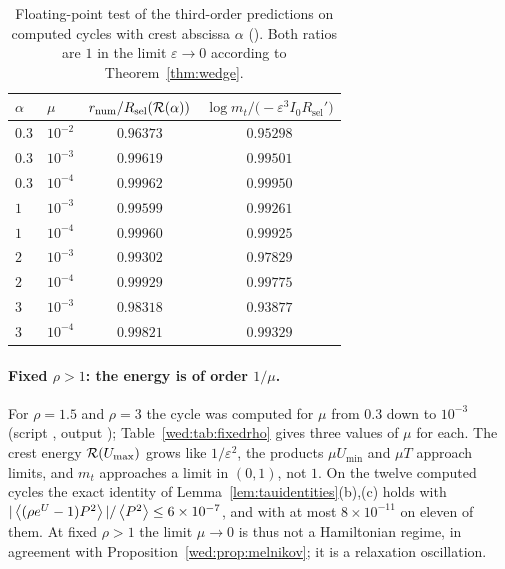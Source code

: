 \begin{table}[ht]
\centering\small
\caption{Floating-point test of the third-order predictions on computed cycles with crest abscissa $\alpha$ (\protect{}). Both ratios are $1$ in the limit $\varepsilon\to0$ according to Theorem~\ref{thm:wedge}.}\label{wed:tab:selection}
\begin{tabular}{llcc}
\toprule
$\alpha$ & $\mu$ & $r_{\rm num}/R_{\mathrm{sel}}(\mathcal R(\alpha))$ & $\log m_t\big/\bigl(-\varepsilon^3I_0R_{\mathrm{sel}}'\bigr)$\\
\midrule
$0.3$ & $10^{-2}$ & $0.96373$ & $0.95298$\\
$0.3$ & $10^{-3}$ & $0.99619$ & $0.99501$\\
$0.3$ & $10^{-4}$ & $0.99962$ & $0.99950$\\
$1$ & $10^{-3}$ & $0.99599$ & $0.99261$\\
$1$ & $10^{-4}$ & $0.99960$ & $0.99925$\\
$2$ & $10^{-3}$ & $0.99302$ & $0.97829$\\
$2$ & $10^{-4}$ & $0.99929$ & $0.99775$\\
$3$ & $10^{-3}$ & $0.98318$ & $0.93877$\\
$3$ & $10^{-4}$ & $0.99821$ & $0.99329$\\
\bottomrule
\end{tabular}
\end{table}

\paragraph{Fixed $\rho>1$: the energy is of order $1/\mu$.}
For $\rho=1.5$ and $\rho=3$ the cycle was computed for $\mu$ from $0.3$ down to $10^{-3}$ (script , output ); Table~\ref{wed:tab:fixedrho} gives three values of $\mu$ for each. The crest energy $\mathcal R(U_{\max})$ grows like $1/\varepsilon^2$, the products $\mu U_{\min}$ and $\mu T$ approach limits, and $m_t$ approaches a limit in $(0,1)$, not $1$. On the twelve computed cycles the exact identity of Lemma~\ref{lem:tauidentities}(b),(c) holds with $|\left\langle (\rho e^U-1)P^2\right\rangle|/\left\langle P^2\right\rangle\le6\times10^{-7}$, and with at most $8\times10^{-11}$ on eleven of them. At fixed $\rho>1$ the limit $\mu\to0$ is thus not a Hamiltonian regime, in agreement with Proposition~\ref{wed:prop:melnikov}; it is a relaxation oscillation.


